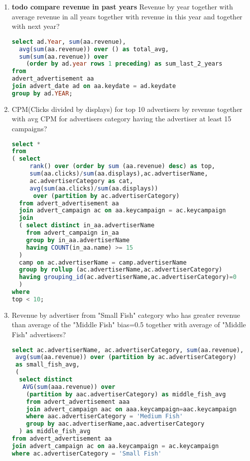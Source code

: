 \begin{enumerate}
\item {\bf todo compare revenue in past years} Revenue by year together with average revenue in all years together with revenue in this year and together with next year?
\begin{lstlisting}[language=sql] 
select ad.Year, sum(aa.revenue), 
  avg(sum(aa.revenue)) over () as total_avg,
  sum(sum(aa.revenue)) over 
    (order by ad.year rows 1 preceding) as sum_last_2_years
from   
advert_advertisement aa
join advert_date ad on aa.keydate = ad.keydate
group by ad.YEAR;
\end{lstlisting}
\item    CPM(Clicks divided by displays) for top 10 advertisers by revenue together with avg CPM for advertisers category having the advertiser at least 15 campaigns?
\begin{lstlisting}[language=sql] 
select *
from 
( select
     rank() over (order by sum (aa.revenue) desc) as top,
     sum(aa.clicks)/sum(aa.displays),ac.advertiserName,
     ac.advertiserCategory as cat, 
     avg(sum(aa.clicks)/sum(aa.displays)) 
      over (partition by ac.advertiserCategory)
  from advert_advertisement aa
  join advert_campaign ac on aa.keycampaign = ac.keycampaign
  join
  ( select distinct in_aa.advertiserName 
    from advert_campaign in_aa
    group by in_aa.advertiserName
    having COUNT(in_aa.name) >= 15
  )
  camp on ac.advertiserName = camp.advertiserName
  group by rollup (ac.advertiserName,ac.advertiserCategory) 
  having grouping_id(ac.advertiserName,ac.advertiserCategory)=0
  )
where 
top < 10;
\end{lstlisting}
\item Revenue by advertiser from "Small Fish" category who has greater revenue than average of the "Middle Fish" bias=0.5 together with average of "Middle Fish" advertisers? 
  \begin{lstlisting}[language=sql] 
select ac.advertiserName, ac.advertiserCategory, sum(aa.revenue), 
 avg(sum(aa.revenue)) over (partition by ac.advertiserCategory) 
 as small_fish_avg,
 ( 
  select distinct
   AVG(sum(aaa.revenue)) over 
    (partition by aac.advertiserCategory) as middle_fish_avg
    from advert_advertisement aaa 
    join advert_campaign aac on aaa.keycampaign=aac.keycampaign
    where aac.advertiserCategory = 'Medium Fish'   
    group by aac.advertiserName,aac.advertiserCategory
  ) as middle_fish_avg
from advert_advertisement aa
join advert_campaign ac on aa.keycampaign = ac.keycampaign
where ac.advertiserCategory = 'Small Fish'

\end{lstlisting}
\end{enumerate}
